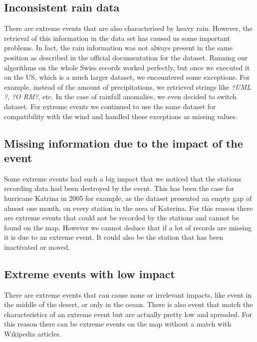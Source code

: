 \subsection{Inconsistent rain data}
There are extreme events that are also characterised by heavy rain. However, the retrieval of this information in the data set has caused us some important problems. In fact, the rain information was not always present in the same position as described in the official documentation for the dataset. Running our algorithms on the whole Swiss records worked perfectly, but once we executed it on the US, which is a much larger dataset, we encountered some exceptions. For example, instead of the amount of precipitations, we retrieved strings like \textit{?UML ?}, \textit{?O RM?}, etc. In the case of rainfall anomalies,  we even decided to switch dataset. For extreme events we continued to use the same dataset for compatibility with the wind and handled these exceptions as missing values.

\subsection{Missing information due to the impact of the event}
Some extreme events had such a big impact that we noticed that the stations recording data had been destroyed by the event. This has been the case for hurricane Katrina in 2005 for example, as the dataset presented an empty gap of almost  one month, on every station in the area of Katerina. For this reason there are extreme events that could not be recorded by the stations and cannot be found on the map. However we cannot deduce that if a lot of records are missing it is due to an extreme event. It could also be the station that has been inactivated or moved.

\subsection{Extreme events with low impact}
There are extreme events that can cause none or irrelevant impacts, like event in the middle of the desert, or only in the ocean. There is also event that match the characteristics of an extreme event but are actually pretty low and spreaded. For this reason there can be extreme events on the map without a match with Wikipedia articles.


